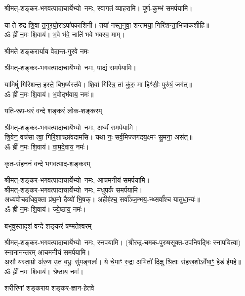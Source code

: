\begin{center}
श्रीमत्-शङ्कर-भगवत्पादाचार्येभ्यो~नमः, स्वागतं व्याहरामि। पूर्ण-कुम्भं समर्पयामि।

या ते॑ रुद्र शि॒वा त॒नूरघो॒राऽपा॑पकाशिनी। तया॑ नस्त॒नुवा॒ शन्त॑मया॒ गिरि॑शन्ता॒\-भिचा॑कशीहि॥\\
ॐ ह्रीं न॒मः शि॒वाय॑। भ॒वे भ॑वे॒ नाति॑ भवे भवस्व॒ माम्।

{श्रीमते शङ्करार्याय वेदान्त-गुरवे नमः}

श्रीमत्-शङ्कर-भगवत्पादाचार्येभ्यो~नमः, पाद्यं समर्पयामि।

यामिषुं॑ गिरिशन्त॒ हस्ते॒ बिभ॒र्ष्यस्त॑वे। शि॒वां गि॑रित्र॒ तां कु॑रु॒ मा हिꣳ॑सीः॒ पुरु॑षं॒ जग॑त्॥\\
ॐ ह्रीं न॒मः शि॒वाय॑। भ॒वोद्भ॑वाय॒ नमः॑॥ 

{यति-रूप-धरं वन्दे शङ्करं लोक-शङ्करम्}

श्रीमत्-शङ्कर-भगवत्पादाचार्येभ्यो~नमः, अर्घ्यं समर्पयामि।\\

शि॒वेन॒ वच॑सा त्वा॒ गिरि॒शाच्छा॑वदामसि। यथा॑ नः॒ सर्व॒मिज्जग॑दय॒क्ष्मꣳ सु॒मना॒ अस॑त्॥\\
ॐ ह्रीं न॒मः शि॒वाय॑। वा॒म॒दे॒वाय॒ नमः॑। 

{कृत-संहननं वन्दे भगवत्पाद-शङ्करम्}

श्रीमत्-शङ्कर-भगवत्पादाचार्येभ्यो~नमः, आचमनीयं समर्पयामि।\\
श्रीमत्-शङ्कर-भगवत्पादाचार्येभ्यो~नमः, मधुपर्कं समर्पयामि।\\

अध्य॑वोचदधिव॒क्ता प्र॑थ॒मो दैव्यो॑ भि॒षक्। अहीꣴ॑श्च॒ सर्वा᳚ञ्ज॒म्भय॒-न्थ्सर्वा᳚श्च यातुधा॒न्यः॑॥\\
ॐ ह्रीं न॒मः शि॒वाय॑। ज्ये॒ष्ठाय॒ नमः॑। 

{बभूवुस्तादृशं वन्दे शङ्करं षण्मतेश्वरम्}

श्रीमत्-शङ्कर-भगवत्पादाचार्येभ्यो~नमः, स्नपयामि। (श्रीरुद्र-चमक-पुरुषसूक्त-उपनिषद्भिः स्नापयित्वा) स्नानानन्तरम् आचमनीयं समर्पयामि।\\


अ॒सौ यस्ता॒म्रो अ॑रु॒ण उ॒त ब॒भ्रुः सु॑म॒ङ्गलः॑। ये चे॒माꣳ रु॒द्रा अ॒भितो॑ दि॒क्षु श्रि॒ताः स॑हस्र॒शोऽवै॑षा॒ꣳ॒ हेड॑ ईमहे॥\\
ॐ ह्रीं न॒मः शि॒वाय॑। श्रे॒ष्ठाय॒ नमः॑। 

{शरीरिणां शङ्कराय शङ्कर-ज्ञान-हेतवे}


\end{center}
